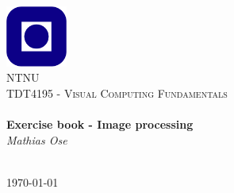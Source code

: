\begin{titlepage}
\begin{center}
\includegraphics[width=0.15\textwidth]{img/NTNU.png}~\\[1cm]

\textsc{\LARGE NTNU}\\[1.5cm]

\textsc{\Large TDT4195 - Visual Computing Fundamentals}\\[0.5cm]

\HRule \\[0.4cm]
{ \huge \bfseries Exercise book - Image processing}\\[0.5cm]
{\large \textit{Mathias Ose}}\\[0.2cm]
\HRule \\[1.5cm]



\vfill

{\large \today}
\end{center}
\end{titlepage}
